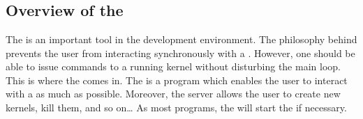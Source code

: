 
\part{\OPRSS{}}



\chapter*{Overview of the \OPRSS{}}

The \OPRSS{} is an important tool in the \COPRS{} development environment.
The philosophy behind \COPRS{} prevents the user from interacting synchronously
with a \CPK{}. However, one should be able to issue commands to a running
kernel without disturbing the \CPK{} main loop. This is where the \OPRSS{}
comes in.  The \OPRSS{} is a program which enables the user to interact
with a \CPK{} as much as possible. Moreover, the server allows the user to
create new kernels, kill them, and so on\dots{} As most \COPRSDE{} programs, the
\OPRSS{} will start the \MP{} if necessary.

